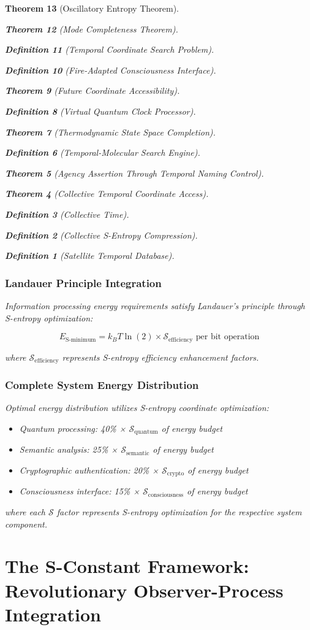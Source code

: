 \documentclass[12pt,a4paper]{article}
\newtheorem{theorem}{Theorem}[section]
\newtheorem{definition}[theorem]{Definition}
\begin{document}
\begin{theorem}[Oscillatory Entropy Theorem]
\begin{theorem}[Mode Completeness Theorem]
\begin{enumerate}
\begin{definition}[Temporal Coordinate Search Problem]
\begin{algorithm}
\begin{definition}[Fire-Adapted Consciousness Interface]
\begin{theorem}[Future Coordinate Accessibility]
\begin{definition}[Virtual Quantum Clock Processor]
\begin{itemize}
\begin{itemize}
\begin{theorem}[Thermodynamic State Space Completion]
\begin{definition}[Temporal-Molecular Search Engine]
\begin{theorem}[Agency Assertion Through Temporal Naming Control]
\begin{remark}
\begin{theorem}[Collective Temporal Coordinate Access]
\begin{definition}[Collective Time]
\begin{definition}[Collective S-Entropy Compression]
\begin{definition}[Satellite Temporal Database]
\begin{algorithm}
\begin{table}[h]
{{\subsubsection{Landauer Principle Integration}

Information processing energy requirements satisfy Landauer's principle through S-entropy optimization:

\begin{equation}
E_{\text{S-minimum}} = k_B T \ln(2) \times \mathcal{S}_{\text{efficiency}} \text{ per bit operation}
\end{equation}

where $\mathcal{S}_{\text{efficiency}}$ represents S-entropy efficiency enhancement factors.

\subsubsection{Complete System Energy Distribution}

Optimal energy distribution utilizes S-entropy coordinate optimization:

\begin{itemize}
\item Quantum processing: 40\% × $\mathcal{S}_{\text{quantum}}$ of energy budget
\item Semantic analysis: 25\% × $\mathcal{S}_{\text{semantic}}$ of energy budget
\item Cryptographic authentication: 20\% × $\mathcal{S}_{\text{crypto}}$ of energy budget
\item Consciousness interface: 15\% × $\mathcal{S}_{\text{consciousness}}$ of energy budget
\end{itemize}

where each $\mathcal{S}$ factor represents S-entropy optimization for the respective system component.

\section{The S-Constant Framework: Revolutionary Observer-Process Integration}

}}
\end{table}
\end{algorithm}
\end{definition}
\end{definition}
\end{definition}
\end{theorem}
\end{remark}
\end{theorem}
\end{definition}
\end{theorem}
\end{itemize}
\end{itemize}
\end{definition}
\end{theorem}
\end{definition}
\end{algorithm}
\end{definition}
\end{enumerate}
\end{theorem}
\end{theorem}
\end{document}
